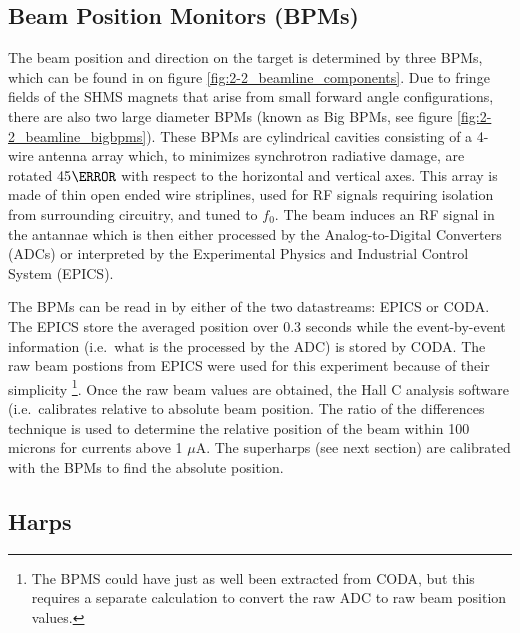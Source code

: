 \hypertarget{beam-position-monitors-bpms}{%
\subsection{Beam Position Monitors
(BPMs)}\label{beam-position-monitors-bpms}}

The beam position and direction on the target is determined by three
BPMs, which can be found in on figure \ref{fig:2-2_beamline_components}.
Due to fringe fields of the SHMS magnets that arise from small forward
angle configurations, there are also two large diameter BPMs (known as
Big BPMs, see figure \ref{fig:2-2_beamline_bigbpms}). These BPMs are
cylindrical cavities consisting of a 4-wire antenna array which, to
minimizes synchrotron radiative damage, are rotated 45\(\degree\) with
respect to the horizontal and vertical axes. This array is made of thin
open ended wire striplines, used for RF signals requiring isolation from
surrounding circuitry, and tuned to \(f_0\). The beam induces an RF
signal in the antannae which is then either processed by the
Analog-to-Digital Converters (ADCs) or interpreted by the Experimental
Physics and Industrial Control System (EPICS).





The BPMs can be read in by either of the two datastreams: EPICS or CODA.
The EPICS store the averaged position over 0.3 seconds while the
event-by-event information (i.e.~what is the processed by the ADC) is
stored by CODA. The raw beam postions from EPICS were used for this
experiment because of their simplicity
\footnote{The BPMS could have just as well been extracted from CODA, but this requires a separate calculation to convert the raw ADC to raw beam position values.}.
Once the raw beam values are obtained, the Hall C analysis software
(i.e.~calibrates relative to absolute beam position. The ratio of the
differences technique is used to determine the relative position of the
beam within 100 microns for currents above 1 \(\mu\)A. The superharps
(see next section) are calibrated with the BPMs to find the absolute
position.

\hypertarget{harps}{%
\subsection{Harps}\label{harps}}

